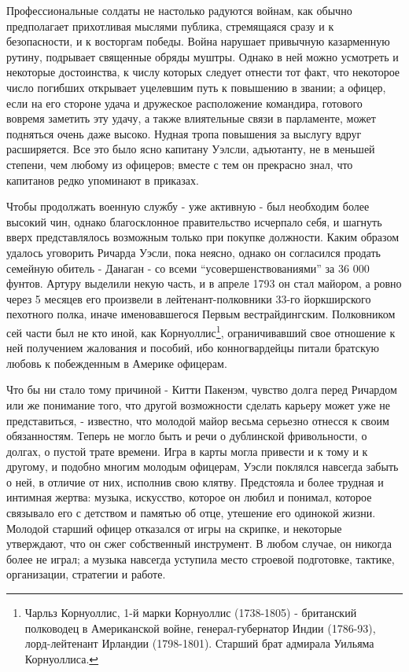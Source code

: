 \documentclass[
  oneside,
  12pt,
  titlepage]{book}
\begin{document}
Профессиональные солдаты не настолько радуются войнам, как обычно предполагает прихотливая мыслями публика, стремящаяся сразу и к безопасности, и к восторгам победы. Война нарушает привычную казарменную рутину, подрывает священные обряды муштры. Однако в ней можно усмотреть и некоторые достоинства, к числу которых следует отнести тот факт, что некоторое число погибших открывает уцелевшим путь к повышению в звании; а офицер, если на его стороне удача и дружеское расположение командира, готового вовремя заметить эту удачу, а также влиятельные связи в парламенте, может подняться очень даже высоко. Нудная тропа повышения за выслугу вдруг расширяется. Все это было ясно капитану Уэлсли, адъютанту, не в меньшей степени, чем любому из офицеров; вместе с тем он прекрасно знал, что капитанов редко упоминают в приказах.

Чтобы продолжать военную службу - уже активную - был необходим более высокий чин, однако благосклонное правительство исчерпало себя, и шагнуть вверх представлялось возможным только при покупке должности. Каким образом удалось уговорить Ричарда Уэсли, пока неясно, однако он согласился продать семейную обитель - Данаган - со всеми ``усовершенствованиями'' за 36 000 фунтов. Артуру выделили некую часть, и в апреле 1793 он стал майором, а ровно через 5 месяцев его произвели в лейтенант-полковники 33-го йоркширского пехотного полка, иначе именовавшегося Первым вестрайдингским. Полковником сей части был не кто иной, как Корнуоллис\footnote{Чарльз Корнуоллис, 1-й марки Корнуоллис (1738-1805) - британский полководец в Американской войне, генерал-губернатор Индии (1786-93), лорд-лейтенант Ирландии (1798-1801). Старший брат адмирала Уильяма Корнуоллиса.}, ограничивавший свое отношение к ней получением жалования и пособий, ибо конногвардейцы питали братскую любовь к побежденным в Америке офицерам.

Что бы ни стало тому причиной - Китти Пакенэм, чувство долга перед Ричардом или же понимание того, что другой возможности сделать карьеру может уже не представиться, - известно, что молодой майор весьма серьезно отнесся к своим обязанностям. Теперь не могло быть и речи о дублинской фривольности, о долгах, о пустой трате времени. Игра в карты могла привести и к тому и к другому, и подобно многим молодым офицерам, Уэсли поклялся навсегда забыть о ней, в отличие от них, исполнив свою клятву. Предстояла и более трудная и интимная жертва: музыка, искусство, которое он любил и понимал, которое связывало его с детством и памятью об отце, утешение его одинокой жизни. Молодой старший офицер отказался от игры на скрипке, и некоторые утверждают, что он сжег собственный инструмент. В любом случае, он никогда более не играл; а музыка навсегда уступила место строевой подготовке, тактике, организации, стратегии и работе.
\end{document}
